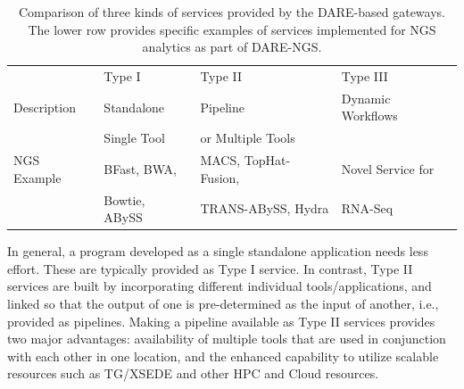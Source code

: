 \documentclass[]{svjour3}
\begin{document}








\begin{table}[!h]
\centering
\begin{tabular}{| l | l | l | l |} \hline \rowcolor[rgb]{0.8,0.8,0.8} &
Type I & Type II & Type III \\ Description & Standalone & Pipeline & Dynamic  Workflows\\ 
& Single Tool & or Multiple Tools & \\\hline 
NGS Example & BFast, BWA, & MACS, TopHat-Fusion, &  Novel Service for 
 \\
 & Bowtie, ABySS & TRANS-ABySS, Hydra & RNA-Seq \\
\hline
\end{tabular}
\caption{Comparison of three kinds of services provided by the
 DARE-based gateways. The lower row provides specific examples of
 services implemented for NGS analytics as part of DARE-NGS.}
\label{table:three-type-service}
\end{table}


In general, a program developed as a single standalone application needs
less effort. These are typically provided as Type I service. In contrast,
Type II services are built by incorporating different individual
tools/applications, and linked so that the output of one is
pre-determined as the input of another, i.e., provided as pipelines.
Making a pipeline available as Type II services provides
two major advantages: availability of multiple tools that are used in
conjunction with each other in one location, and the enhanced
capability to utilize scalable resources such as TG/XSEDE and other
HPC and Cloud resources.
\end{document}
